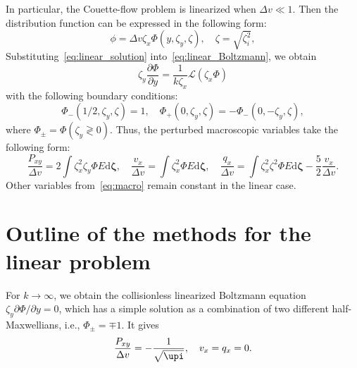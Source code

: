 \documentclass[]{jfm}
\newcommand{\dd}{\mathrm{d}}
\newcommand{\pder}[2][]{\frac{\partial#1}{\partial#2}}
\newcommand{\Pder}[2][]{\partial#1/\partial#2}
\newcommand{\dzeta}{\boldsymbol{\dd\zeta}}
\begin{document}
In particular, the Couette-flow problem is linearized when \(\Delta{v}\ll 1\).
Then the distribution function can be expressed in the following form:
\begin{equation}\label{eq:linear_solution}
    \phi = \Delta{v} \zeta_x \Phi(y,\zeta_y,\zeta), \quad \zeta = \sqrt{\zeta_i^2},
\end{equation}
Substituting~\eqref{eq:linear_solution} into~\eqref{eq:linear_Boltzmann}, we obtain
\begin{equation}\label{eq:linear_equation}
    \zeta_y \pder[\Phi]{y} = \frac1{k\zeta_x}\mathcal{L}(\zeta_x\Phi)
\end{equation}
with the following boundary conditions:
\begin{equation}\label{eq:linear_bc}
    \Phi_-(1/2,\zeta_y,\zeta) = 1, \quad \Phi_+(0,\zeta_y,\zeta) = -\Phi_-(0,-\zeta_y,\zeta),
\end{equation}
where \(\Phi_\pm = \Phi(\zeta_y \gtrless 0)\).
Thus, the perturbed macroscopic variables take the following form:
\begin{equation}\label{eq:linear_macro}
    \frac{P_{xy}}{\Delta{v}} = 2\int \zeta_x^2 \zeta_y \Phi E\dzeta, \quad
    \frac{v_x}{\Delta{v}} = \int \zeta_x^2 \Phi E\dzeta, \quad
    \frac{q_x}{\Delta{v}} = \int \zeta_x^2 \zeta^2 \Phi E\dzeta - \frac52 \frac{v_x}{\Delta{v}}.
\end{equation}
Other variables from~\eqref{eq:macro} remain constant in the linear case.

\section{Outline of the methods for the linear problem}

For \(k\to\infty\), we obtain the collisionless linearized Boltzmann equation \(\zeta_y\Pder[\Phi]{y} = 0\),
which has a simple solution as a combination of two different half-Maxwellians, i.e., \(\Phi_\pm = \mp 1\).
It gives
\begin{gather}\label{eq:linear_free_macro}
    \frac{P_{xy}}{\Delta{v}} = -\frac1{\sqrt{\upi}}, \quad v_x = q_x = 0.
\end{gather}
\end{document}
